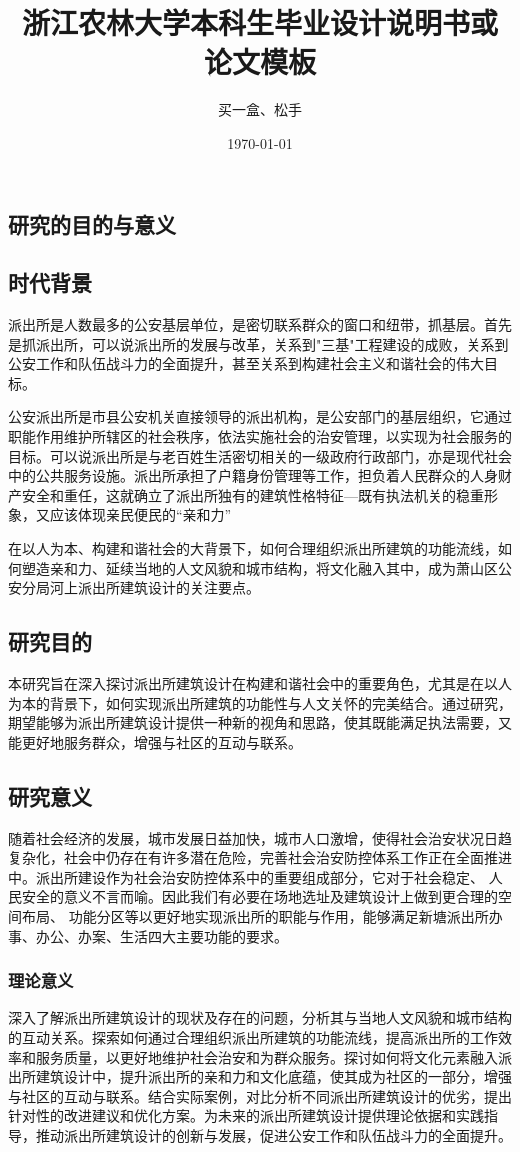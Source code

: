 \documentclass[AutoFakeBold]{ZafuResearchProposal}
\author{买一盒、松手}%
\date{\today}%
\title{{浙江农林大学本科生}{毕业设计说明书或论文模板}}%
\begin{document}
\proposalCover

\mainmatter

\begin{RPSectionBox}
    \section{研究的目的与意义}
    \subsection{时代背景}    
    派出所是人数最多的公安基层单位，是密切联系群众的窗口和纽带，抓基层。首先是抓派出所，可以说派出所的发展与改革，关系到"三基"工程建设的成败，关系到公安工作和队伍战斗力的全面提升，甚至关系到构建社会主义和谐社会的伟大目标。\par
    公安派出所是市县公安机关直接领导的派出机构，是公安部门的基层组织，它通过职能作用维护所辖区的社会秩序，依法实施社会的治安管理，以实现为社会服务的目标。可以说派出所是与老百姓生活密切相关的一级政府行政部门，亦是现代社会中的公共服务设施。派出所承担了户籍身份管理等工作，担负着人民群众的人身财产安全和重任，这就确立了派出所独有的建筑性格特征---既有执法机关的稳重形象，又应该体现亲民便民的``亲和力''\par
    在以人为本、构建和谐社会的大背景下，如何合理组织派出所建筑的功能流线，如何塑造亲和力、延续当地的人文风貌和城市结构，将文化融入其中，成为萧山区公安分局河上派出所建筑设计的关注要点。
    \subsection{研究目的}
    本研究旨在深入探讨派出所建筑设计在构建和谐社会中的重要角色，尤其是在以人为本的背景下，如何实现派出所建筑的功能性与人文关怀的完美结合。通过研究，期望能够为派出所建筑设计提供一种新的视角和思路，使其既能满足执法需要，又能更好地服务群众，增强与社区的互动与联系。
    \subsection{研究意义}
    随着社会经济的发展，城市发展日益加快，城市人口激增，使得社会治安状况日趋复杂化，社会中仍存在有许多潜在危险，完善社会治安防控体系工作正在全面推进中。派出所建设作为社会治安防控体系中的重要组成部分，它对于社会稳定、 人民安全的意义不言而喻。因此我们有必要在场地选址及建筑设计上做到更合理的空间布局、 功能分区等以更好地实现派出所的职能与作用，能够满足新塘派出所办事、办公、办案、生活四大主要功能的要求。
    \subsubsection{理论意义}
    深入了解派出所建筑设计的现状及存在的问题，分析其与当地人文风貌和城市结构的互动关系。探索如何通过合理组织派出所建筑的功能流线，提高派出所的工作效率和服务质量，以更好地维护社会治安和为群众服务。探讨如何将文化元素融入派出所建筑设计中，提升派出所的亲和力和文化底蕴，使其成为社区的一部分，增强与社区的互动与联系。结合实际案例，对比分析不同派出所建筑设计的优劣，提出针对性的改进建议和优化方案。为未来的派出所建筑设计提供理论依据和实践指导，推动派出所建筑设计的创新与发展，促进公安工作和队伍战斗力的全面提升。

\end{RPSectionBox}
\end{document}

